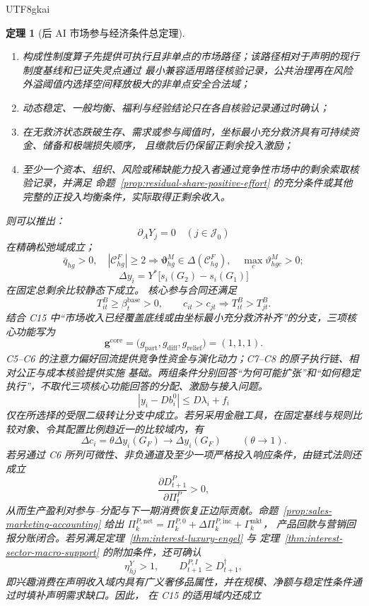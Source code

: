 \documentclass[12pt,a4paper,openany]{report}
\newtheorem{theorem}{定理}[chapter]
\newcommand{\Goods}{\mathcal J}
\newcommand{\Abs}[1]{\left\lvert #1\right\rvert}
\begin{document}
\begin{CJK*}{UTF8}{gkai}
\begin{theorem}[后 AI 市场参与经济条件总定理]
\begin{enumerate}[label=\textnormal{C\arabic*:},leftmargin=3.5em]
  \item 构成性制度算子先提供可执行且非单点的市场路径；该路径相对于声明的现行制度基线和已证失灵点通过
  最小兼容适用路径核验记录，公共治理再在风险外溢阈值内选择空间释放极大的非单点安全合法域；
  \item 动态稳定、一般均衡、福利与经验结论只在各自核验记录通过时确认；
  \item 在无救济状态跌破生存、需求或参与阈值时，坐标最小充分救济具有可持续资金、储备和极端损失顺序，
  且缴款后仍保留正剩余投入激励；
  \item 至少一个资本、组织、风险或稀缺能力投入者通过竞争性市场中的剩余索取核验记录，并满足
  命题~\ref{prop:residual-share-positive-effort} 的充分条件或其他完整的正投入均衡条件，实际取得正剩余收入。
\end{enumerate}
则可以推出：
\[
  \partial_A Y_j=0
  \quad(j\in\Goods_0)
\]
在精确松弛域成立；
\[
  \bar q_{hg}>0,
  \quad |\mathcal C_{hg}^{F}|\ge2
  \Longrightarrow
  \boldsymbol\vartheta_{hg}^{M}\in
  \Delta(\mathcal C_{hg}^{F}),
  \quad \max_c\vartheta_{hgc}^{M}>0;
\]
\[
  \Delta y_i
  =
  Y^*\bigl[s_i(G_2)-s_i(G_1)\bigr]
\]
在固定总剩余比较静态下成立。
核心参与合同还满足
\[
  T_{it}^B\ge\beta_t^{\mathrm{base}}>0,\qquad
  c_{it}>c_{jt}\Longrightarrow T_{it}^B>T_{jt}^B.
\]
结合 C15 中“市场收入已经覆盖底线或由坐标最小充分救济补齐”的分支，三项核心功能写为
\[
  \boxed{\mathbf g^{\mathrm{core}}
  =\bigl(g_{\mathrm{part}},g_{\mathrm{diff}},g_{\mathrm{relief}}\bigr)
  =(1,1,1)}.
\]
C5--C6 的注意力偏好回流提供竞争性资金与演化动力；C7--C8 的原子执行链、相对公正与成本核验提供实施
基础。两组条件分别回答“为何可能扩张”和“如何稳定执行”，不取代三项核心功能回答的分配、激励与接入问题。
\[
  \Abs{y_i-Db_i^0}\le D\lambda_i+f_i
\]
仅在所选择的受限二级转让分支中成立。若另采用金融工具，在固定基线与规则比较对象、令其配置比例趋近一的比较域内，有
\[
  \Delta c_i=\theta\Delta y_i(G_F)
  \longrightarrow
  \Delta y_i(G_F)
  \qquad(\theta\to1).
\]
若另通过 C6 所列可微性、非负通道及至少一项严格投入响应条件，由链式法则还成立
\[
  \frac{\partial D_{t+1}^P}{\partial\Pi_t^P}>0,
\]
从而生产盈利对参与--分配与下一期消费恢复正边际贡献。命题~\ref{prop:sales-marketing-accounting} 给出
\(\Pi_k^{P,\mathrm{net}}=\Pi_k^{P,0}+\Delta\Pi_k^{P,\mathrm{inc}}+\Gamma_k^{\mathrm{mkt}}\)，
产品回款与营销回报分账闭合。若另满足定理~\ref{thm:interest-luxury-engel} 与
定理~\ref{thm:interest-sector-macro-support} 的附加条件，还可确认
\[
  \eta_{hj}^{Y}>1,
  \qquad
  D_{t+1}^{P,I}\ge D_{t+1}^{\dagger},
\]
即兴趣消费在声明收入域内具有广义奢侈品属性，并在规模、净额与稳定性条件通过时填补声明需求缺口。因此，
在 C15 的适用域内还成立

\end{theorem}
\end{CJK*}
\end{document}
